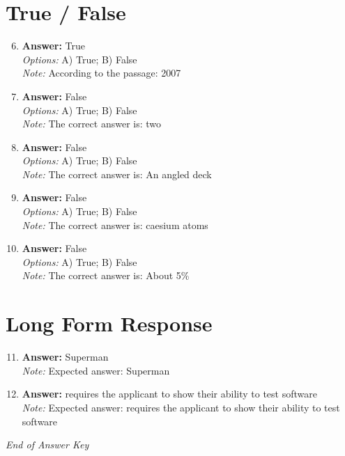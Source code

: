 \documentclass[12pt]{article}
\begin{document}
\section*{True / False}
\begin{enumerate}[label=\arabic*.]
\setcounter{enumi}{5}
\item \textbf{Answer:} True
\\ \textit{Options:} A) True; B) False
\\ \textit{Note:} According to the passage: 2007
\item \textbf{Answer:} False
\\ \textit{Options:} A) True; B) False
\\ \textit{Note:} The correct answer is: two
\item \textbf{Answer:} False
\\ \textit{Options:} A) True; B) False
\\ \textit{Note:} The correct answer is: An angled deck
\item \textbf{Answer:} False
\\ \textit{Options:} A) True; B) False
\\ \textit{Note:} The correct answer is: caesium atoms
\item \textbf{Answer:} False
\\ \textit{Options:} A) True; B) False
\\ \textit{Note:} The correct answer is: About 5\%
\end{enumerate}

\section*{Long Form Response}
\begin{enumerate}[label=\arabic*.]
\setcounter{enumi}{10}
\item \textbf{Answer:} Superman
\\ \textit{Note:} Expected answer: Superman
\item \textbf{Answer:} requires the applicant to show their ability to test software
\\ \textit{Note:} Expected answer: requires the applicant to show their ability to test software
\end{enumerate}

\vfill
\noindent\textit{End of Answer Key}
\end{document}

